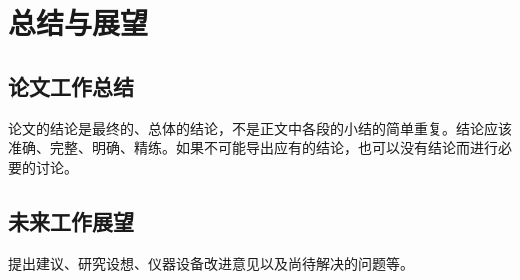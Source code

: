 \chapter{总结与展望}
\label{cha:conclusion}



\section{论文工作总结}

论文的结论是最终的、总体的结论，不是正文中各段的小结的简单重复。结论应该准确、完整、明确、精练。如果不可能导出应有的结论，也可以没有结论而进行必要的讨论。



\section{未来工作展望}

提出建议、研究设想、仪器设备改进意见以及尚待解决的问题等。